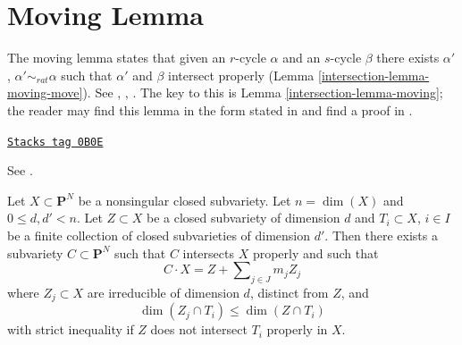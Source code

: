 \section{Moving Lemma}
\label{intersection-section-moving-lemma}
The moving lemma states that given an $r$-cycle $\alpha$ and an $s$-cycle
$\beta$ there exists $\alpha'$, $\alpha' \sim_{rat} \alpha$ such that
$\alpha'$ and $\beta$ intersect properly (Lemma \ref{intersection-lemma-moving-move}).
See \cite{Samuel}, \cite{ChevalleyI}, \cite{ChevalleyII}.
The key to this is Lemma \ref{intersection-lemma-moving}; the reader may find
this lemma in the form stated in
\cite[Example 11.4.1]{F} and find a proof in \cite{Roberts}.

\begin{lemma}[Moving]
\label{intersection-lemma-moving}
\href{https://stacks.math.columbia.edu/tag/0B0E}{\texttt{Stacks tag 0B0E}}

\begin{reference}
See \cite{Roberts}.
\end{reference}
Let $X \subset \mathbf{P}^N$ be a nonsingular closed subvariety.
Let $n = \dim(X)$ and $0 \leq d, d' < n$. Let $Z \subset X$ be a closed
subvariety of dimension $d$ and $T_i \subset X$, $i \in I$ be a finite
collection of closed subvarieties of dimension $d'$. Then there exists
a subvariety $C \subset \mathbf{P}^N$ such that $C$ intersects $X$
properly and such that
$$
C \cdot X = Z + \sum\nolimits_{j \in J} m_j Z_j
$$
where $Z_j \subset X$ are irreducible of dimension $d$, distinct from $Z$, and
$$
\dim(Z_j \cap T_i) \leq \dim(Z \cap T_i)
$$
with strict inequality if $Z$ does not intersect $T_i$ properly in $X$.
\end{lemma}

